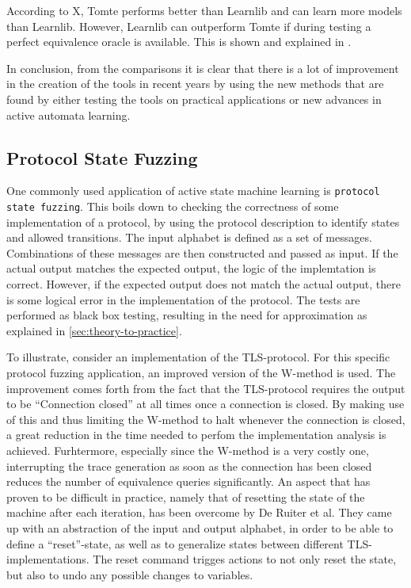 \documentclass[multi,crop=false,class=article]{standalone}
\begin{document}
According to X, Tomte performs better than Learnlib and can learn more models
than Learnlib. However, Learnlib can outperform Tomte if during testing a
perfect equivalence oracle is available. This is shown and explained in
\cite{Aarts2014}.


In conclusion, from the comparisons it is clear that there is a lot of
improvement in the creation of the tools in recent years by using the new
methods that are found by either testing the tools on practical applications or
new advances in active automata learning.

\subsection{Protocol State Fuzzing}
One commonly used application of active state machine learning is
\texttt{protocol state fuzzing}\cite{deRuiter15,Aarts13,Cho10,Aarts10}. This
boils down to checking the correctness of some implementation of a protocol, by
using the protocol description to identify states and allowed transitions. The
input alphabet is defined as a set of messages. Combinations of these messages
are then constructed and passed as input. If the actual output matches the 
expected output, the logic of the implemtation is correct. However, if the 
expected output does not match the actual output, there is some logical error
in the implementation of the protocol. The tests are performed as black box
testing, resulting in the need for approximation as explained in
\ref{sec:theory-to-practice}.

To illustrate, consider an implementation of the TLS-protocol\cite{deRuiter15}.
For this specific protocol fuzzing application, an improved version of the
W-method\cite{Chow78} is used. The improvement comes forth from the fact that
the TLS-protocol requires the output to be ``Connection closed'' at all times
once a connection is closed. By making use of this and thus limiting the
W-method to halt whenever the connection is closed, a great reduction in the
time needed to perfom the implementation analysis is achieved. Furhtermore, 
especially since the W-method is a very costly one, interrupting the trace 
generation as soon as the connection has been closed reduces the number of 
equivalence queries significantly.
An aspect that has proven to be difficult in practice, namely that of resetting
the state of the machine after each iteration, has been overcome by De Ruiter
et al. They came up with an abstraction of the input and output alphabet, in
order to be able to define a ``reset''-state, as well as to generalize states 
between different TLS-implementations. The reset command trigges actions to
not only reset the state, but also to undo any possible changes to variables.
\end{document}
